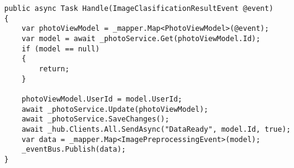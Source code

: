 \begin{itemize}
\begin{lstlisting}[caption={Przekazanie danych do aplikacji mobilnej oraz .}]
public async Task Handle(ImageClasificationResultEvent @event)
{
	var photoViewModel = _mapper.Map<PhotoViewModel>(@event);
	var model = await _photoService.Get(photoViewModel.Id);
	if (model == null)
	{
		return;
	}
	
	photoViewModel.UserId = model.UserId;
	await _photoService.Update(photoViewModel);
	await _photoService.SaveChanges();
	await _hub.Clients.All.SendAsync("DataReady", model.Id, true);
	var data = _mapper.Map<ImagePreprocessingEvent>(model);
	_eventBus.Publish(data);
}
\end{lstlisting}

\end{itemize}
